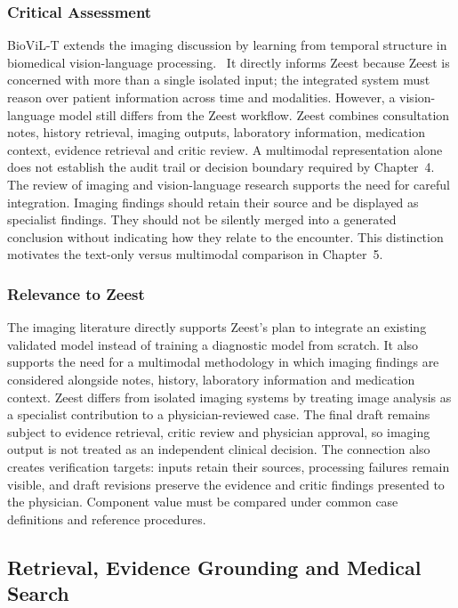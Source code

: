\subsubsection{Critical Assessment}

BioViL-T extends the imaging discussion by learning from temporal structure in biomedical vision-language processing.~\cite{zeestB:biovilt} It directly informs Zeest because Zeest is concerned with more than a single isolated input; the integrated system must reason over patient information across time and modalities. However, a vision-language model still differs from the Zeest workflow. Zeest combines consultation notes, history retrieval, imaging outputs, laboratory information, medication context, evidence retrieval and critic review. A multimodal representation alone does not establish the audit trail or decision boundary required by Chapter~4. The review of imaging and vision-language research supports the need for careful integration. Imaging findings should retain their source and be displayed as specialist findings. They should not be silently merged into a generated conclusion without indicating how they relate to the encounter. This distinction motivates the text-only versus multimodal comparison in Chapter~5.

\subsubsection{Relevance to Zeest}

The imaging literature directly supports Zeest's plan to integrate an existing validated model instead of training a diagnostic model from scratch. It also supports the need for a multimodal methodology in which imaging findings are considered alongside notes, history, laboratory information and medication context. Zeest differs from isolated imaging systems by treating image analysis as a specialist contribution to a physician-reviewed case. The final draft remains subject to evidence retrieval, critic review and physician approval, so imaging output is not treated as an independent clinical decision. The connection also creates verification targets: inputs retain their sources, processing failures remain visible, and draft revisions preserve the evidence and critic findings presented to the physician. Component value must be compared under common case definitions and reference procedures.

\subsection{Retrieval, Evidence Grounding and Medical Search}
